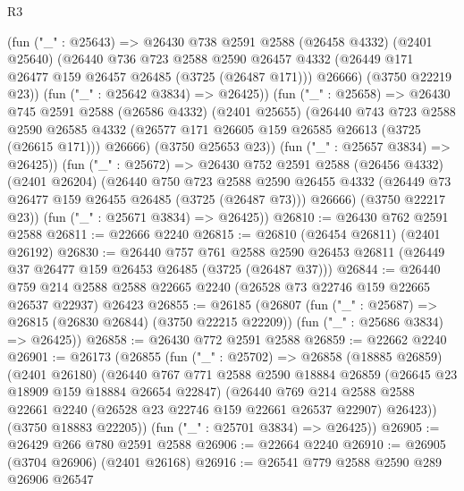 \begin{lexlean}{R3}
\begin{coremodule}
          (fun ("_" : @25643) =>
          @26430
            @738
            @2591
            @2588
            (@26458 @4332)
            (@2401 @25640)
            (@26440
              @736
              @723
              @2588
              @2590
              @26457
              @4332
              (@26449 @171 @26477 @159 @26457 @26485 (@3725 (@26487 @171)))
              @26666)
            (@3750 @22219 @23))
          (fun ("_" : @25642 @3834) => @26425))
        (fun ("_" : @25658) =>
        @26430
          @745
          @2591
          @2588
          (@26586 @4332)
          (@2401 @25655)
          (@26440
            @743
            @723
            @2588
            @2590
            @26585
            @4332
            (@26577 @171 @26605 @159 @26585 @26613 (@3725 (@26615 @171)))
            @26666)
          (@3750 @25653 @23))
        (fun ("_" : @25657 @3834) => @26425))
      (fun ("_" : @25672) =>
      @26430
        @752
        @2591
        @2588
        (@26456 @4332)
        (@2401 @26204)
        (@26440
          @750
          @723
          @2588
          @2590
          @26455
          @4332
          (@26449 @73 @26477 @159 @26455 @26485 (@3725 (@26487 @73)))
          @26666)
        (@3750 @22217 @23))
      (fun ("_" : @25671 @3834) => @26425))
@26810 := @26430 @762 @2591 @2588
@26811 := @22666 @2240
@26815 := @26810 (@26454 @26811) (@2401 @26192)
@26830 := @26440
    @757
    @761
    @2588
    @2590
    @26453
    @26811
    (@26449 @37 @26477 @159 @26453 @26485 (@3725 (@26487 @37)))
@26844 := @26440
    @759
    @214
    @2588
    @2588
    @22665
    @2240
    (@26528 @73 @22746 @159 @22665 @26537 @22937)
    @26423
@26855 := @26185
    (@26807
      (fun ("_" : @25687) => @26815 (@26830 @26844) (@3750 @22215 @22209))
      (fun ("_" : @25686 @3834) => @26425))
@26858 := @26430 @772 @2591 @2588
@26859 := @22662 @2240
@26901 := @26173
    (@26855
      (fun ("_" : @25702) =>
      @26858
        (@18885 @26859)
        (@2401 @26180)
        (@26440
          @767
          @771
          @2588
          @2590
          @18884
          @26859
          (@26645 @23 @18909 @159 @18884 @26654 @22847)
          (@26440
            @769
            @214
            @2588
            @2588
            @22661
            @2240
            (@26528 @23 @22746 @159 @22661 @26537 @22907)
            @26423))
        (@3750 @18883 @22205))
      (fun ("_" : @25701 @3834) => @26425))
@26905 := @26429 @266 @780 @2591 @2588
@26906 := @22664 @2240
@26910 := @26905 (@3704 @26906) (@2401 @26168)
@26916 := @26541 @779 @2588 @2590 @289 @26906 @26547

\end{coremodule}
\end{lexlean}
